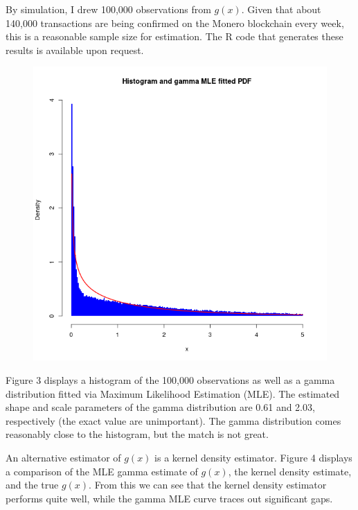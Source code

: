 \documentclass[english]{paper}
\begin{document}
By simulation, I drew 100,000 observations from $g(x)$. Given that
about 140,000 transactions are being confirmed on the Monero blockchain
every week, this is a reasonable sample size for estimation. The R
code that generates these results is available upon request.

\begin{figure}
\caption{}

\includegraphics[scale=0.75]{images/Histogram-and-fitted-gamma-PDF}
\end{figure}

Figure 3 displays a histogram of the 100,000 observations as well
as a gamma distribution fitted via Maximum Likelihood Estimation (MLE).
The estimated shape and scale parameters of the gamma distribution
are 0.61 and 2.03, respectively (the exact value are unimportant).
The gamma distribution comes reasonably close to the histogram, but
the match is not great.

An alternative estimator of $g(x)$ is a kernel density estimator.
Figure 4 displays a comparison of the MLE gamma estimate of $g(x)$,
the kernel density estimate, and the true $g(x)$. From this we can
see that the kernel density estimator performs quite well, while the
gamma MLE curve traces out significant gaps.
\end{document}
